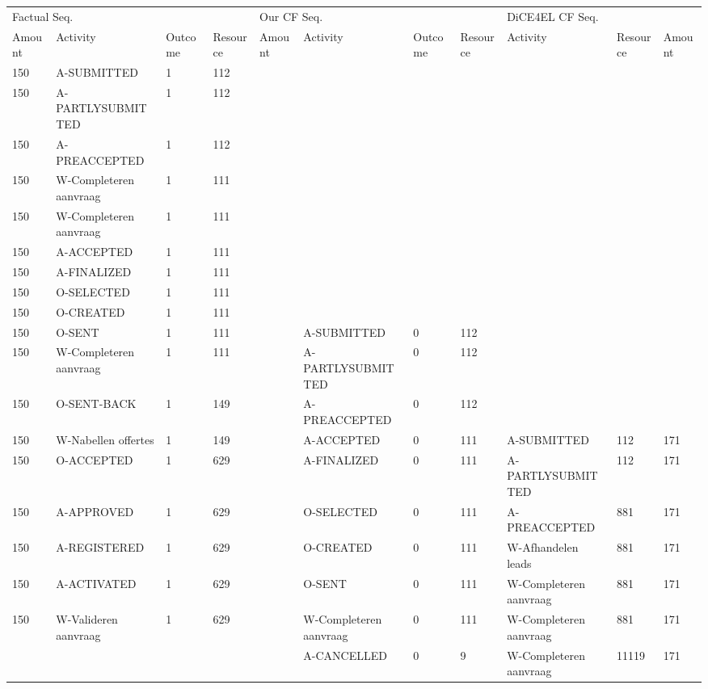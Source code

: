 \begin{tabular}{lllllllllll}
\toprule
\multicolumn{4}{l}{Factual Seq.} & \multicolumn{4}{l}{Our CF Seq.} & \multicolumn{3}{l}{DiCE4EL CF Seq.} \\
Amount & Activity & Outcome & Resource & Amount & Activity & Outcome & Resource & Activity & Resource & Amount \\
\midrule
150 & A-SUBMITTED & 1 & 112 &  &  &  &  &  &  &  \\
150 & A-PARTLYSUBMITTED & 1 & 112 &  &  &  &  &  &  &  \\
150 & A-PREACCEPTED & 1 & 112 &  &  &  &  &  &  &  \\
150 & W-Completeren aanvraag & 1 & 111 &  &  &  &  &  &  &  \\
150 & W-Completeren aanvraag & 1 & 111 &  &  &  &  &  &  &  \\
150 & A-ACCEPTED & 1 & 111 &  &  &  &  &  &  &  \\
150 & A-FINALIZED & 1 & 111 &  &  &  &  &  &  &  \\
150 & O-SELECTED & 1 & 111 &  &  &  &  &  &  &  \\
150 & O-CREATED & 1 & 111 &  &  &  &  &  &  &  \\
150 & O-SENT & 1 & 111 &  & A-SUBMITTED & 0 & 112 &  &  &  \\
150 & W-Completeren aanvraag & 1 & 111 &  & A-PARTLYSUBMITTED & 0 & 112 &  &  &  \\
150 & O-SENT-BACK & 1 & 149 &  & A-PREACCEPTED & 0 & 112 &  &  &  \\
150 & W-Nabellen offertes & 1 & 149 &  & A-ACCEPTED & 0 & 111 & A-SUBMITTED & 112 & 171 \\
150 & O-ACCEPTED & 1 & 629 &  & A-FINALIZED & 0 & 111 & A-PARTLYSUBMITTED & 112 & 171 \\
150 & A-APPROVED & 1 & 629 &  & O-SELECTED & 0 & 111 & A-PREACCEPTED & 881 & 171 \\
150 & A-REGISTERED & 1 & 629 &  & O-CREATED & 0 & 111 & W-Afhandelen leads & 881 & 171 \\
150 & A-ACTIVATED & 1 & 629 &  & O-SENT & 0 & 111 & W-Completeren aanvraag & 881 & 171 \\
150 & W-Valideren aanvraag & 1 & 629 &  & W-Completeren aanvraag & 0 & 111 & W-Completeren aanvraag & 881 & 171 \\
 &  &  &  &  & A-CANCELLED & 0 & 9 & W-Completeren aanvraag & 11119 & 171 \\
\bottomrule
\end{tabular}
